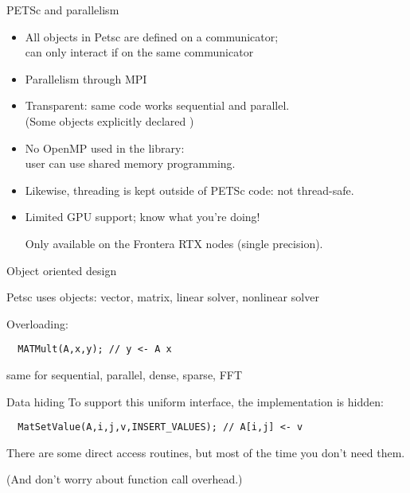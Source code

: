 \begin{details}
\begin{numberedframe}{PETSc and parallelism}

\begin{itemize}
\item
All objects in Petsc are defined on a communicator;\\
can only interact if on the same communicator
\item
Parallelism through MPI
\item 
  Transparent: same code works sequential and parallel.\\
  (Some objects explicitly declared )
\item
No OpenMP used in the library:\\
user can use shared memory programming.
\item
Likewise, threading is kept outside of PETSc code: not thread-safe.
\item Limited \ac{GPU} support; know what you're doing!
\begin{taccnote}
Only available on the Frontera RTX nodes (single precision).
\end{taccnote}
\end{itemize}

\end{numberedframe}
\end{details}

\begin{numberedframe}{Object oriented design}

Petsc uses objects: vector, matrix, linear solver, nonlinear solver

Overloading: 
\begin{verbatim}
  MATMult(A,x,y); // y <- A x
\end{verbatim}
same for sequential, parallel, dense, sparse, FFT
\end{numberedframe}

\begin{numberedframe}{Data hiding}
To support this uniform interface, the implementation is hidden:
\begin{verbatim}
  MatSetValue(A,i,j,v,INSERT_VALUES); // A[i,j] <- v
\end{verbatim}
There are some direct access routines, but most of the time you don't
need them.

(And don't worry about function call overhead.)
\end{numberedframe}
